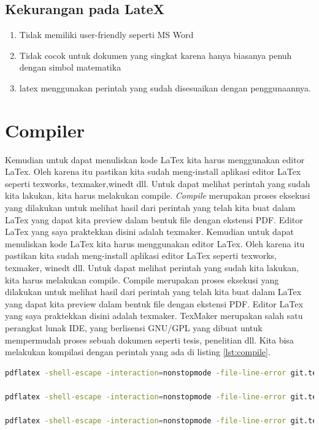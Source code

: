 \subsection{Kekurangan pada LateX}
\begin{enumerate}
\item Tidak memiliki user-friendly seperti MS Word
\item Tidak cocok untuk dokumen yang singkat karena hanya biasanya penuh dengan simbol matematika
\item latex menggunakan perintah yang sudah disesuaikan dengan penggunaannya.
\end{enumerate}

\section{Compiler}
Kemudian untuk dapat menuliskan kode LaTex kita harus menggunakan editor LaTex. Oleh karena itu pastikan kita sudah meng-install aplikasi editor LaTex seperti texworks, texmaker,winedt dll. Untuk dapat melihat perintah yang sudah kita lakukan, kita harus melakukan compile. \textit{Compile} merupakan proses eksekusi yang dilakukan untuk melihat hasil dari perintah yang telah kita buat dalam LaTex yang dapat kita preview dalam bentuk file dengan ekstensi PDF. Editor LaTex yang saya praktekkan disini adalah texmaker.
Kemudian untuk dapat menuliskan kode LaTex kita harus menggunakan editor LaTex. Oleh karena itu pastikan kita sudah meng-install aplikasi editor LaTex seperti texworks, texmaker, winedt dll. Untuk dapat melihat perintah yang sudah kita lakukan, kita harus melakukan compile. Compile merupakan proses eksekusi yang dilakukan untuk melihat hasil dari perintah yang telah kita buat dalam LaTex yang dapat kita preview dalam bentuk file dengan ekstensi PDF. Editor LaTex yang saya praktekkan disini adalah texmaker. TexMaker merupakan salah satu perangkat lunak IDE, yang berlisensi GNU/GPL yang dibuat untuk mempermudah proses sebuah dokumen seperti tesis, penelitian dll. Kita bisa melakukan kompilasi dengan perintah yang ada di listing \ref{lst:compile}.

\begin{lstlisting}[caption=Perintah kompilasi latex keluaran pdf,label={lst:compile},language=sh]
pdflatex -shell-escape -interaction=nonstopmode -file-line-error git.tex | grep ".*:[0-9]*:.*|LaTeX Warning:"

pdflatex -shell-escape -interaction=nonstopmode -file-line-error git.tex | grep ".*:[0-9]*:.*"

pdflatex -shell-escape -interaction=nonstopmode -file-line-error git.tex | grep -i ".*:[0-9]*:.*\|warning"
\end{lstlisting} 

